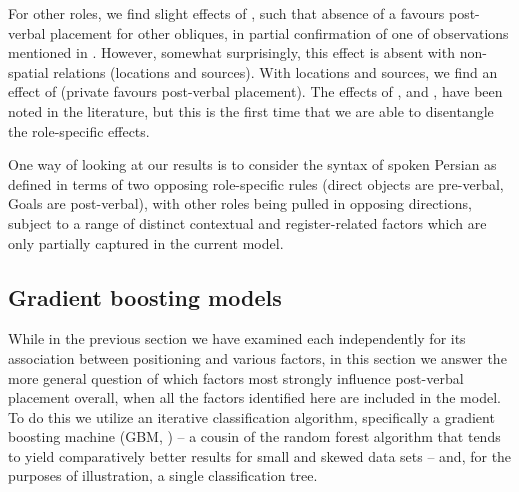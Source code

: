 \documentclass[output=paper,colorlinks,citecolor=brown,draftmode]{langscibook}
\begin{document}
For other roles, we find slight effects of , such that absence of a  favours post-verbal placement for other obliques, in partial confirmation of one of  observations mentioned in . However, somewhat surprisingly, this effect is absent with non- spatial relations (locations and sources). With locations and sources, we find an effect of  (private  favours post-verbal placement). The effects of , and , have been noted in the literature, but this is the first time that we are able to disentangle the role-specific effects.

One way of looking at our results is to consider the syntax of spoken Persian as defined in terms of two opposing role-specific rules (direct objects are pre-verbal, Goals are post-verbal), with other roles being pulled in opposing directions, subject to a range of distinct contextual and register-related factors which are only partially captured in the current model.


\subsection{Gradient boosting models}\label{Persian:4.2}

While in the previous section we have examined each  independently for its association between positioning and various factors, in this section we answer the more general question of which factors most strongly influence post-verbal placement overall, when all the factors identified here are included in the model. To do this we utilize an iterative classification algorithm, specifically a gradient boosting machine (GBM, \citealt{Friedman2001Greedy}) – a cousin of the random forest algorithm that tends to yield comparatively better results for small and skewed data sets – and, for the purposes of illustration, a single classification tree.
\end{document}
